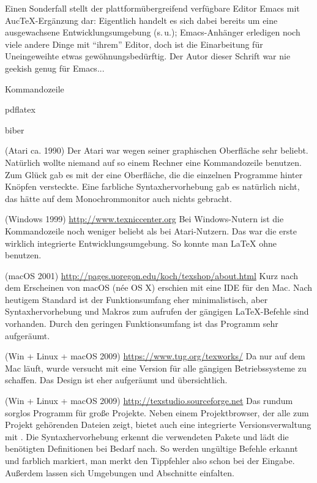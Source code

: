 Einen Sonderfall stellt der plattformübergreifend verfügbare Editor Emacs mit AucTeX-Ergänzung
dar: Eigentlich handelt es sich dabei bereits um eine ausgewachsene Entwicklungsumgebung (s.\,u.);
Emacs-Anhänger erledigen noch viele andere Dinge mit \enquote{ihrem} Editor, doch ist die 
Einarbeitung für Uneingeweihte etwas gewöhnungsbedürftig.
Der Autor dieser Schrift war nie geekish genug für Emacs...

Kommandozeile

pdflatex

biber



\begin{labeling}{}
\item[\Program{TeXShell}] (Atari ca. 1990) Der Atari war wegen seiner
  graphischen Oberfläche sehr beliebt.  Natürlich wollte niemand auf so
  einem Rechner eine Kommandozeile benutzen.  Zum Glück gab es mit der
   eine Oberfläche, die die einzelnen Programme hinter
  Knöpfen versteckte.  Eine farbliche Syntaxhervorhebung gab es natürlich
  nicht, das hätte auf dem Monochrommonitor auch nichts gebracht.

\item[\Program{TexnicCenter}] (Windows 1999)
  \url{http://www.texniccenter.org}  Bei Windows-Nutern ist die
  Kommandozeile noch weniger beliebt als bei Atari-Nutzern.  Das
   war die erste wirklich integrierte
  Entwicklungsumgebung.  So konnte man \LaTeX{} ohne 
  benutzen.

\item[\Program{Texshop}] (macOS 2001)
  \url{http://pages.uoregon.edu/koch/texshop/about.html}  Kurz nach dem
  Erscheinen von macOS (née OS X) erschien mit  eine IDE
  für den Mac.  Nach heutigem Standard ist der Funktionsumfang eher
  minimalistisch, aber Syntaxhervorhebung und Makros zum aufrufen der
  gängigen \LaTeX{}-Befehle sind vorhanden.  Durch den geringen
  Funktionsumfang ist das Programm sehr aufgeräumt.

\item[\Program{TeXworks}] (Win + Linux + macOS 2009)
  \url{https://www.tug.org/texworks/}  Da  nur auf dem Mac
  läuft, wurde versucht mit  eine Version für alle
  gängigen Betriebssysteme zu schaffen.  Das Design ist eher aufgeräumt und
  übersichtlich.

\item[\Program{TeXStudio}] (Win + Linux + macOS 2009)
  \url{http://texstudio.sourceforge.net}  Das rundum sorglos Programm für
  große Projekte. Neben einem Projektbrowser, der alle zum Projekt
  gehörenden Dateien zeigt, bietet  auch eine integrierte
  Versionsverwaltung mit .  Die Syntaxhervorhebung erkennt die
  verwendeten Pakete und lädt die benötigten Definitionen bei Bedarf nach.
  So werden ungültige Befehle erkannt und farblich markiert, man merkt den
  Tippfehler also schon bei der Eingabe. Außerdem lassen sich Umgebungen
  und Abschnitte einfalten.


\end{labeling}
